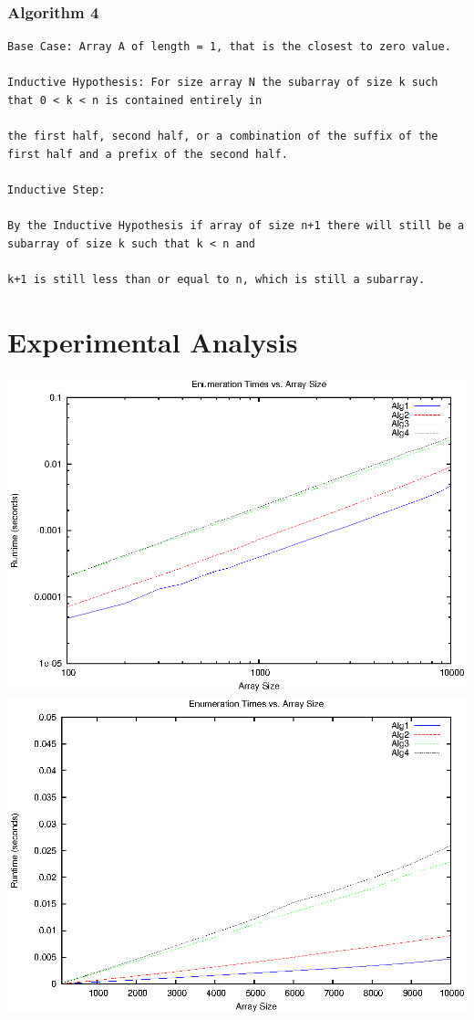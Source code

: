 \documentclass[letterpaper,10pt,titlepage]{article}
\begin{document}
\subsubsection{Algorithm 4}
\begin{verbatim}
Base Case: Array A of length = 1, that is the closest to zero value.

Inductive Hypothesis: For size array N the subarray of size k such that 0 < k < n is contained entirely in 

the first half, second half, or a combination of the suffix of the first half and a prefix of the second half. 

Inductive Step:

By the Inductive Hypothesis if array of size n+1 there will still be a subarray of size k such that k < n and 

k+1 is still less than or equal to n, which is still a subarray.
\end{verbatim}

\section{Experimental Analysis}

\includegraphics[width=\textwidth]{graph.eps}
\includegraphics[width=\textwidth]{graph2.eps}
\end{document}
